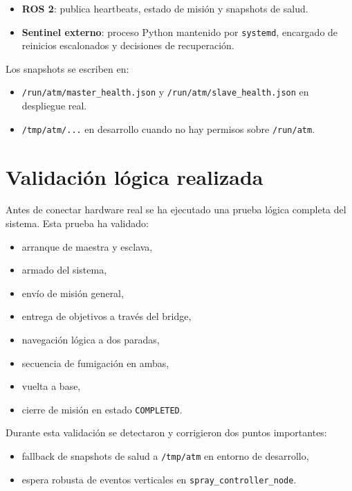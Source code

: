 \documentclass[11pt,a4paper]{article}
\begin{document}
\begin{itemize}
    \item \textbf{ROS 2}: publica heartbeats, estado de misi\'on y snapshots de salud.
    \item \textbf{Sentinel externo}: proceso Python mantenido por \texttt{systemd}, encargado de reinicios escalonados y decisiones de recuperaci\'on.
\end{itemize}

Los snapshots se escriben en:
\begin{itemize}
    \item \texttt{/run/atm/master\_health.json} y \texttt{/run/atm/slave\_health.json} en despliegue real.
    \item \texttt{/tmp/atm/...} en desarrollo cuando no hay permisos sobre \texttt{/run/atm}.
\end{itemize}

\section{Validaci\'on l\'ogica realizada}
Antes de conectar hardware real se ha ejecutado una prueba l\'ogica completa del sistema. Esta prueba ha validado:

\begin{itemize}
    \item arranque de maestra y esclava,
    \item armado del sistema,
    \item env\'io de misi\'on general,
    \item entrega de objetivos a trav\'es del bridge,
    \item navegaci\'on l\'ogica a dos paradas,
    \item secuencia de fumigaci\'on en ambas,
    \item vuelta a base,
    \item cierre de misi\'on en estado \texttt{COMPLETED}.
\end{itemize}

Durante esta validaci\'on se detectaron y corrigieron dos puntos importantes:

\begin{itemize}
    \item fallback de snapshots de salud a \texttt{/tmp/atm} en entorno de desarrollo,
    \item espera robusta de eventos verticales en \texttt{spray\_controller\_node}.
\end{itemize}
\end{document}
